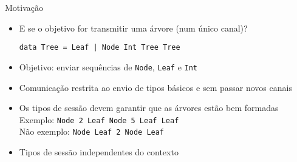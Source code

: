 \begin{frame}[fragile]{Motivação}
  \begin{itemize}
  \item E se o objetivo for transmitir uma árvore (num único canal)?
    \newline
    
    \lstinline"data Tree = Leaf | Node Int Tree Tree"
    \newline
  \item Objetivo: enviar sequências de \lstinline|Node|, \lstinline|Leaf| e \lstinline|Int|\\
  \newline
  \item Comunicação restrita ao envio de tipos básicos e sem passar novos canais

\item Os tipos de sessão devem garantir que as árvores estão bem formadas\\
      Exemplo: \lstinline|Node 2 Leaf Node 5 Leaf Leaf|\\
      Não exemplo: \lstinline|Node Leaf 2 Node Leaf|
\item Tipos de sessão independentes do contexto
  \end{itemize}
\end{frame}


